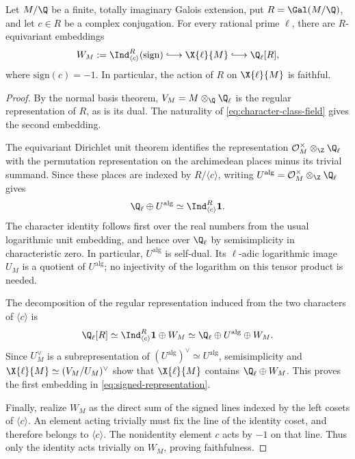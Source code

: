 \begin{proposition}\label{prop:signed-representation}
Let $M/\Q$ be a finite, totally imaginary Galois extension, put
$R=\Gal(M/\Q)$, and let $c\in R$ be a complex conjugation.
For every rational prime $\ell$, there are $R$-equivariant embeddings
\begin{equation}\label{eq:signed-representation}
 W_M:=\Ind_{\langle c\rangle}^{R}(\mathrm{sign})
 \lhook\joinrel\longrightarrow\X{\ell}{M}
 \lhook\joinrel\longrightarrow\Q_\ell[R],
\end{equation}
where $\mathrm{sign}(c)=-1$.  In particular, the action of $R$ on
$\X{\ell}{M}$ is faithful.
\end{proposition}

\begin{proof}
By the normal basis theorem, $V_M=M\otimes_\Q\Q_\ell$ is the
regular representation of $R$, as is its dual.  The naturality of
\eqref{eq:character-class-field} gives the second embedding.

The equivariant Dirichlet unit theorem
\cite[Section~3]{bass1966} identifies the representation
$\mathcal O_M^\times\otimes_\Z\Q_\ell$ with the permutation
representation on the archimedean places minus its trivial summand.
Since these places are indexed by $R/\langle c\rangle$, writing
$U^{\mathrm{alg}}=\mathcal O_M^\times\otimes_\Z\Q_\ell$ gives
\[
 \Q_\ell\oplus U^{\mathrm{alg}}
 \simeq\Ind_{\langle c\rangle}^{R}\mathbf1.
\]
The character identity follows first over the real numbers from the
usual logarithmic unit embedding, and hence over $\Q_\ell$ by
semisimplicity in characteristic zero.  In particular,
$U^{\mathrm{alg}}$ is self-dual.  Its $\ell$-adic logarithmic image
$U_M$ is a quotient of $U^{\mathrm{alg}}$; no injectivity of the
logarithm on this tensor product is needed.

The decomposition of the regular representation induced from the
two characters of $\langle c\rangle$ is
\[
 \Q_\ell[R]
 \simeq\Ind_{\langle c\rangle}^{R}\mathbf1\oplus W_M
 \simeq\Q_\ell\oplus U^{\mathrm{alg}}\oplus W_M.
\]
Since $U_M^\vee$ is a subrepresentation of
$(U^{\mathrm{alg}})^\vee\simeq U^{\mathrm{alg}}$, semisimplicity
and $\X{\ell}{M}\simeq(V_M/U_M)^\vee$ show that
$\X{\ell}{M}$ contains $\Q_\ell\oplus W_M$.  This proves the
first embedding in \eqref{eq:signed-representation}.

Finally, realize $W_M$ as the direct sum of the signed lines indexed
by the left cosets of $\langle c\rangle$.  An element acting
trivially must fix the line of the identity coset, and therefore
belongs to $\langle c\rangle$.  The nonidentity element $c$ acts
by $-1$ on that line.  Thus only the identity acts trivially on
$W_M$, proving faithfulness.
\end{proof}
